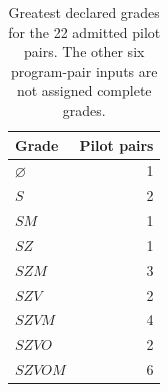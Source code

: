 \begin{table}[t]
\caption{Greatest declared grades for the 22 admitted pilot pairs. The other six program-pair inputs are not assigned complete grades.}\label{tab:grades}
\centering
\begin{tabular}{lr}
\toprule Grade & Pilot pairs\\\midrule
$\varnothing$ & 1\\
$S$ & 2\\
$SM$ & 1\\
$SZ$ & 1\\
$SZM$ & 3\\
$SZV$ & 2\\
$SZVM$ & 4\\
$SZVO$ & 2\\
$SZVOM$ & 6\\
\bottomrule
\end{tabular}
\end{table}
